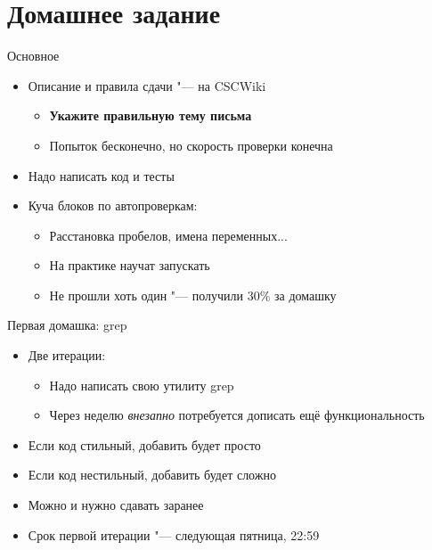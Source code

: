 \section{Домашнее задание}

\begin{frame}[t]{Основное}
	\begin{itemize}
		\item Описание и правила сдачи "--- на CSCWiki
			\begin{itemize}
				\item \textbf{Укажите правильную тему письма}
				\item Попыток бесконечно, но скорость проверки конечна
			\end{itemize}
		\item Надо написать код и тесты
		\item Куча блоков по автопроверкам:
			\begin{itemize}
			\item Расстановка пробелов, имена переменных...
			\item На практике научат запускать
			\item Не прошли хоть один "--- получили 30\% за домашку
			\end{itemize}
	\end{itemize}
\end{frame}

\begin{frame}[t]{Первая домашка: grep}
	\begin{itemize}
		\item Две итерации:
			\begin{itemize}
			\item Надо написать свою утилиту grep
			\item Через неделю \textit{внезапно} потребуется дописать
				ещё функциональность
			\end{itemize}
		\item Если код стильный, добавить будет просто
		\item Если код нестильный, добавить будет сложно
		\item Можно и нужно сдавать заранее
		\item Срок первой итерации "--- следующая пятница, 22:59
	\end{itemize}
\end{frame}

